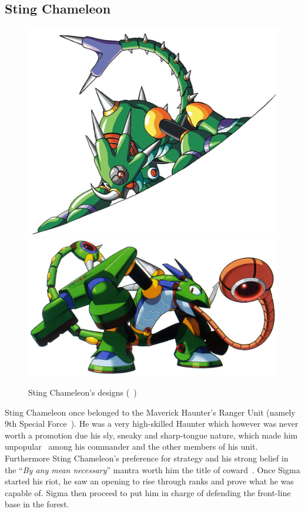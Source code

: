 \subsection{Sting Chameleon}\label{boss:Sting_chameleon}
\begin{figure}[htp]
	\centering
	\includegraphics[width=0.5\linewidth]{figures/X1/Sting_chameleon/Stingchameleon.jpg}
	\includegraphics[width=0.45\linewidth]{figures/X1/Sting_chameleon/MHXStingChameleon.jpg}
	\caption{Sting Chameleon's designs (~\cite{book:MMX_Complete_art})}
\end{figure}
Sting Chameleon once belonged to the Maverick Haunter's Ranger Unit (namely 9th Special Force~\cite{wayback:X_resources}). He was a very high-skilled Haunter which however was never worth a promotion due his sly, sneaky and sharp-tongue nature, which made him unpopular~\cite{Xcoll1:Manual_X1} among his commander and the other members of his unit. Furthermore Sting Chameleon's preference for strategy and his strong belief in the ``\textit{By any mean necessary}'' mantra  worth him the title of coward~\cite{MHX:manual}. Once Sigma started his riot, he saw an opening to rise through ranks and prove what he was capable of. Sigma then proceed to put him in charge of defending the front-line base in the forest.

